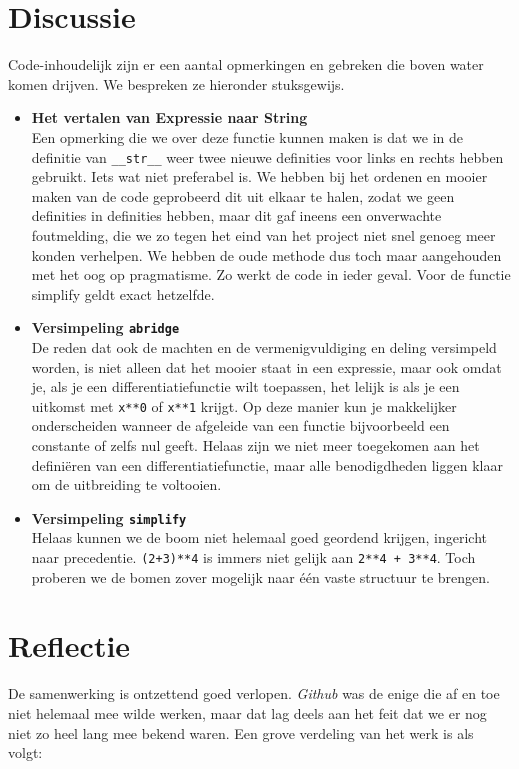 \documentclass[12pt]{article}
\begin{document}
\newpage

\section{Discussie}
Code-inhoudelijk zijn er een aantal opmerkingen en gebreken die boven water komen drijven. We bespreken ze  hieronder stuksgewijs. 
\begin{itemize}
\item \textbf{Het vertalen van Expressie naar String}\\
Een opmerking die we over deze functie kunnen maken is dat we in de definitie van \texttt{\_\_str\_\_} weer twee nieuwe definities voor links en rechts hebben gebruikt. Iets wat niet preferabel is. We hebben bij het ordenen en mooier maken van de code geprobeerd dit uit elkaar te halen, zodat we geen definities in definities hebben, maar dit gaf ineens een onverwachte foutmelding, die we zo tegen het eind van het project niet snel genoeg meer konden verhelpen. We hebben de oude methode dus toch maar aangehouden met het oog op pragmatisme. Zo werkt de code in ieder geval. Voor de functie simplify geldt exact hetzelfde.
\item \textbf{Versimpeling \texttt{abridge}}\\
De reden dat ook de machten en de vermenigvuldiging en deling versimpeld worden, is niet alleen dat het mooier staat in een expressie, maar ook omdat je, als je een differentiatiefunctie wilt toepassen, het lelijk is als je een uitkomst met \texttt{x**0} of \texttt{x**1} krijgt. Op deze manier kun je makkelijker onderscheiden wanneer de afgeleide van een functie bijvoorbeeld een constante of zelfs nul geeft. Helaas zijn we niet meer toegekomen aan het defini\"eren van een differentiatiefunctie, maar alle benodigdheden liggen klaar om de uitbreiding te voltooien.
\item \textbf{Versimpeling \texttt{simplify}}\\
Helaas kunnen we de boom niet helemaal goed geordend krijgen, ingericht naar precedentie. \texttt{(2+3)**4} is immers niet gelijk aan \texttt{2**4 + 3**4}. Toch proberen we de  bomen zover mogelijk naar \'e\'en vaste structuur te brengen.

\end{itemize}


\section{Reflectie}
De samenwerking is ontzettend goed verlopen. \textit{Github} was de enige die af en toe niet helemaal mee wilde werken, maar dat lag deels aan het feit dat we er nog niet zo heel lang mee bekend waren. Een grove verdeling van het werk is als volgt:
\end{document}
